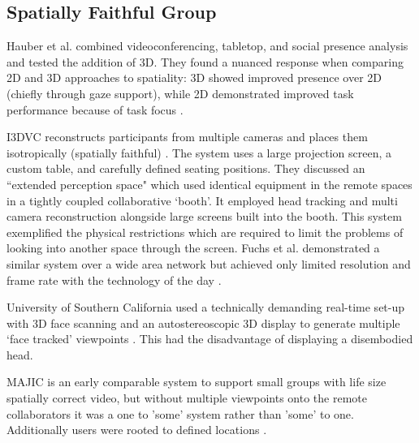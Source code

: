 \subsection{Spatially Faithful Group}
Hauber et al. combined videoconferencing, tabletop, and social presence analysis and tested the addition of 3D. They found a nuanced response when comparing 2D and 3D approaches to spatiality: 3D showed improved presence over 2D (chiefly through gaze support), while 2D demonstrated improved task performance because of task focus \cite{Hauber2006}.\par
I3DVC reconstructs participants from multiple cameras and places them isotropically (spatially faithful) \cite{Kauff2002, Kauff2002a}. The system uses a large projection screen, a custom table, and carefully defined seating positions. They discussed an ``extended perception space" which used identical equipment in the remote spaces in a tightly coupled collaborative `booth'. It employed head tracking and multi camera reconstruction alongside large screens built into the booth. This system exemplified the physical restrictions which are required to limit the problems of looking into another space through the screen. Fuchs et al. demonstrated a similar system over a wide area network but achieved only limited resolution and frame rate with the technology of the day \cite{Fuchs2002}. \par University of Southern California used a technically demanding real-time set-up with 3D face scanning and an autostereoscopic 3D display to generate multiple `face tracked' viewpoints \cite{Jones2009}. This had the disadvantage of displaying a disembodied head.\par                
MAJIC is an early comparable system to support small groups with life size spatially correct video, but without multiple viewpoints onto the remote collaborators it was a one to 'some' system rather than 'some' to one. Additionally users were rooted to defined locations \cite{Ichikawa1995, Okada1994}.\par
